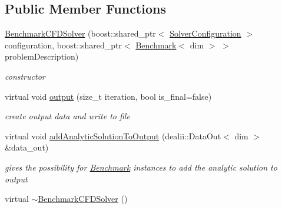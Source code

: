 \subsection*{Public Member Functions}
\begin{DoxyCompactItemize}
\item 
\hypertarget{classnatrium_1_1BenchmarkCFDSolver_aa9cdc67e4218230f54d74b0182170705}{
\hyperlink{classnatrium_1_1BenchmarkCFDSolver_aa9cdc67e4218230f54d74b0182170705}{BenchmarkCFDSolver} (boost::shared\_\-ptr$<$ \hyperlink{classnatrium_1_1SolverConfiguration}{SolverConfiguration} $>$ configuration, boost::shared\_\-ptr$<$ \hyperlink{classnatrium_1_1Benchmark}{Benchmark}$<$ dim $>$ $>$ problemDescription)}
\label{classnatrium_1_1BenchmarkCFDSolver_aa9cdc67e4218230f54d74b0182170705}

\begin{DoxyCompactList}\small\item\em constructor \item\end{DoxyCompactList}\item 
\hypertarget{classnatrium_1_1BenchmarkCFDSolver_a9d63cc1e2fe66301533713d4f1ce43a6}{
virtual void \hyperlink{classnatrium_1_1BenchmarkCFDSolver_a9d63cc1e2fe66301533713d4f1ce43a6}{output} (size\_\-t iteration, bool is\_\-final=false)}
\label{classnatrium_1_1BenchmarkCFDSolver_a9d63cc1e2fe66301533713d4f1ce43a6}

\begin{DoxyCompactList}\small\item\em create output data and write to file \item\end{DoxyCompactList}\item 
\hypertarget{classnatrium_1_1BenchmarkCFDSolver_a96be8add7c888ef4e6a1cb41cd2b40f6}{
virtual void \hyperlink{classnatrium_1_1BenchmarkCFDSolver_a96be8add7c888ef4e6a1cb41cd2b40f6}{addAnalyticSolutionToOutput} (dealii::DataOut$<$ dim $>$ \&data\_\-out)}
\label{classnatrium_1_1BenchmarkCFDSolver_a96be8add7c888ef4e6a1cb41cd2b40f6}

\begin{DoxyCompactList}\small\item\em gives the possibility for \hyperlink{classnatrium_1_1Benchmark}{Benchmark} instances to add the analytic solution to output \item\end{DoxyCompactList}\item 
\hypertarget{classnatrium_1_1BenchmarkCFDSolver_aafd3c01db648420ce6d98a8349bdfa09}{
virtual \hyperlink{classnatrium_1_1BenchmarkCFDSolver_aafd3c01db648420ce6d98a8349bdfa09}{$\sim$BenchmarkCFDSolver} ()}
\label{classnatrium_1_1BenchmarkCFDSolver_aafd3c01db648420ce6d98a8349bdfa09}


\end{DoxyCompactItemize}
